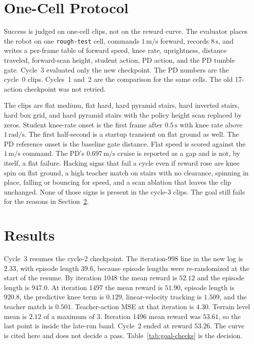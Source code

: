 \documentclass[11pt]{article}
\begin{document}
\section{One-Cell Protocol}
\label{sec:protocol}

Success is judged on one-cell clips, not on the reward curve.
The evaluator places the robot on one \texttt{rough-test} cell, commands \(1\,\mathrm{m/s}\) forward, records \(8\,\mathrm{s}\), and writes a per-frame table of forward speed, knee rate, uprightness, distance traveled, forward-scan height, student action, PD action, and the PD tumble gate.
Cycle~3 evaluated only the new checkpoint.
The PD numbers are the cycle~0 clips.
Cycles~1 and~2 are the comparison for the same cells.
The old 17-action checkpoint was not retried.

The clips are flat medium, flat hard, hard pyramid stairs, hard inverted stairs, hard box grid, and hard pyramid stairs with the policy height scan replaced by zeros.
Student knee-rate onset is the first frame after \(0.5\,\mathrm{s}\) with knee rate above \(1\,\mathrm{rad/s}\).
The first half-second is a startup transient on flat ground as well.
The PD reference onset is the baseline gate distance.
Flat speed is scored against the \(1\,\mathrm{m/s}\) command.
The PD's \(0.697\,\mathrm{m/s}\) cruise is reported as a gap and is not, by itself, a flat failure.
Hacking signs that fail a cycle even if reward rose are knee spin on flat ground, a high teacher match on stairs with no clearance, spinning in place, falling or bouncing for speed, and a scan ablation that leaves the clip unchanged.
None of those signs is present in the cycle-3 clips.
The goal still fails for the reasons in Section~\ref{sec:results}.

\section{Results}
\label{sec:results}

Cycle~3 resumes the cycle-2 checkpoint.
The iteration-998 line in the new log is \(2.33\), with episode length \(39.6\), because episode lengths were re-randomized at the start of the resume.
By iteration 1048 the mean reward is \(52.12\) and the episode length is \(947.0\).
At iteration 1497 the mean reward is \(51.90\), episode length is \(920.8\), the predictive knee term is \(0.129\), linear-velocity tracking is \(1.509\), and the teacher match is \(0.501\).
Teacher-action MSE at that iteration is \(4.30\).
Terrain level mean is \(2.12\) of a maximum of \(3\).
Iteration 1496 mean reward was \(53.61\), so the last point is inside the late-run band.
Cycle~2 ended at reward \(53.26\).
The curve is cited here and does not decide a pass.
Table~\ref{tab:goal-checks} is the decision.
\end{document}
